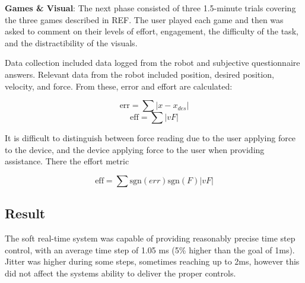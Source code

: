 \documentclass[12pt]{report}
\begin{document}
\textbf{Games \& Visual}: The next phase consisted of three 1.5-minute trials covering the three games described in REF. The user played each game and then was asked to comment on their levels of effort, engagement, the difficulty of the task, and the distractibility of the visuals. 

Data collection included data logged from the robot and subjective questionnaire answers. Relevant data from the robot included position, desired position, velocity, and force. From these, error and effort are calculated:

\begin{equation}
\text{err} = \sum |x - x_{des}|
\end{equation}
\begin{equation}
\text{eff} = \sum |vF|
\end{equation}

It is difficult to distinguish between force reading due to the user applying force to the device, and the device applying force to the user when providing assistance. There the effort metric 
	
\begin{equation}
\text{eff} =  \sum \text{sgn}(err)\text{sgn}(F)|vF|
\end{equation}	
	
		\subsection{Result}
		
		The soft real-time system was capable of providing reasonably precise time step control, with an average time step of 1.05 ms (5\% higher than the goal of 1ms). Jitter was higher during some steps, sometimes reaching up to 2ms, however this did not affect the systems ability to deliver the proper controls. 

\end{document}
